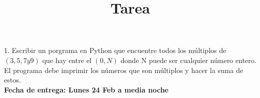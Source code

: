 \documentclass[12pt]{article}
\title{Tarea}
\begin{document}
\maketitle

1. Escribir un porgrama en Python que encuentre todos los m\'ultiplos de $(3, 5, 7 y 9)$ que hay entre el $(0, N)$ donde N puede ser cualquier n\'umero entero. El programa debe imprimir los n\'umeros que son m\'ultiplos y hacer la suma de estos. \\

\textbf{Fecha de entrega: Lunes 24 Feb a media noche}
\end{document}
